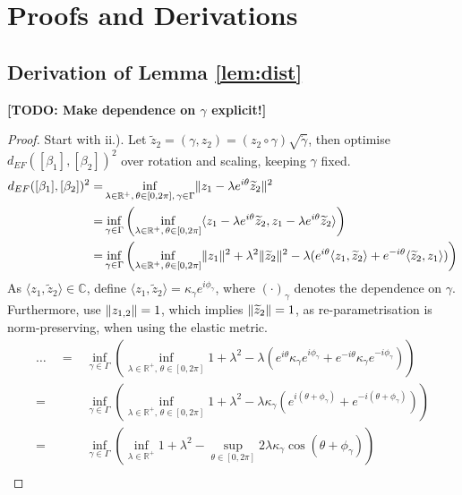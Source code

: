 \section{Proofs and Derivations}

\subsection{Derivation of Lemma \ref{lem:dist}}
\label{app:deriv-full-proc-dist}
\textbf{[TODO: Make dependence on $\gamma$ explicit!]}
\begin{proof}
  Start with ii.).
  Let $\widetilde z_2 = (\gamma, z_2) = (z_2 \circ \gamma) \sqrt{\dot\gamma}$, then optimise $d_{EF}([\beta_1],[\beta_2])^2$ over rotation and scaling, keeping $\gamma$ fixed.
  \begin{align*}
    d_{EF}([\beta_1],[\beta_2])^2 
      = & \inf_{\lambda \in \mathbb{R}^+,\, \theta \in [0,2\pi],\, \gamma \in \Gamma} \lVert z_1 - \lambda e^{i\theta} \widetilde z_2\rVert^2 \\
      = & \inf_{\gamma \in \Gamma} \left( \inf_{\lambda \in \mathbb{R}^+,\, \theta \in [0,2\pi]} \langle z_1 - \lambda e^{i\theta} \widetilde z_2, z_1 - \lambda e^{i\theta} \widetilde z_2 \rangle \right) \\
      = & \inf_{\gamma \in \Gamma} \left( \inf_{\lambda \in \mathbb{R}^+,\, \theta \in [0,2\pi]} \lVert z_1\rVert^2 + \lambda^2 \lVert\widetilde z_2\rVert^2 - \lambda ( e^{i\theta} \langle z_1, \widetilde z_2 \rangle + e^{-i\theta} \langle \widetilde z_2, z_1 \rangle ) \right) 
  \end{align*}
  As $\langle z_1, \widetilde z_2 \rangle \in \mathbb{C}$, define $\langle z_1, \widetilde z_2 \rangle = \kappa_\gamma e^{i\phi_\gamma}$, where $(\cdot)_\gamma$ denotes the dependence on $\gamma$. Furthermore, use $\lVert z_{1,2}\rVert = 1$, which implies $\lVert\widetilde z_2\rVert = 1$, as re-parametrisation is norm-preserving, when using the elastic metric.
  \begin{align*}
    \dots\quad
     = & \inf_{\gamma \in \Gamma} \left( \inf_{\lambda \in \mathbb{R}^+,\, \theta \in [0,2\pi]} 1 + \lambda^2  - \lambda ( e^{i\theta} \kappa_\gamma e^{i\phi_\gamma} + e^{-i\theta} \kappa_\gamma e^{-i\phi_\gamma} ) \right) \\
     = & \inf_{\gamma \in \Gamma} \left( \inf_{\lambda \in \mathbb{R}^+,\, \theta \in [0,2\pi]} 1 + \lambda^2  - \lambda \kappa_\gamma \left( e^{i(\theta + \phi_\gamma)} + e^{-i (\theta + \phi_\gamma)} \right) \right) \\
     = &  \inf_{\gamma \in \Gamma} \left( \inf_{\lambda \in \mathbb{R}^+} 1 + \lambda^2  - \sup_{\theta \in [0,2\pi]} 2 \lambda \kappa_\gamma \cos{(\theta + \phi_\gamma)} \right) \\

\end{align*}
\end{proof}
